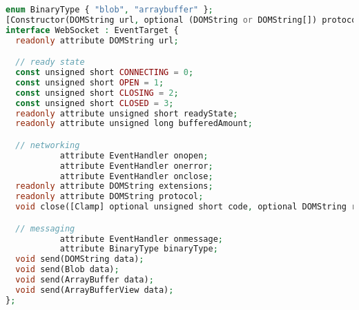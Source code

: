 \begin{lstlisting}[language=PHP]
enum BinaryType { "blob", "arraybuffer" };
[Constructor(DOMString url, optional (DOMString or DOMString[]) protocols), Exposed=Window,Worker]
interface WebSocket : EventTarget {
  readonly attribute DOMString url;

  // ready state
  const unsigned short CONNECTING = 0;
  const unsigned short OPEN = 1;
  const unsigned short CLOSING = 2;
  const unsigned short CLOSED = 3;
  readonly attribute unsigned short readyState;
  readonly attribute unsigned long bufferedAmount;

  // networking
           attribute EventHandler onopen;
           attribute EventHandler onerror;
           attribute EventHandler onclose;
  readonly attribute DOMString extensions;
  readonly attribute DOMString protocol;
  void close([Clamp] optional unsigned short code, optional DOMString reason);

  // messaging
           attribute EventHandler onmessage;
           attribute BinaryType binaryType;
  void send(DOMString data);
  void send(Blob data);
  void send(ArrayBuffer data);
  void send(ArrayBufferView data);
};
\end{lstlisting}





\begin{lstlisting}[language=PHP]

\end{lstlisting}




\begin{lstlisting}[language=PHP]

\end{lstlisting}



\begin{lstlisting}[language=PHP]

\end{lstlisting}



\begin{lstlisting}[language=PHP]

\end{lstlisting}




\begin{lstlisting}[language=PHP]

\end{lstlisting}




